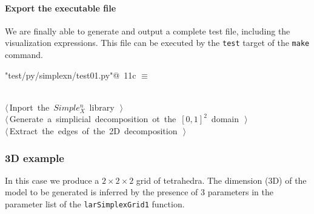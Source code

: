 \documentclass[11pt,oneside]{article}	%
\begin{document}
\paragraph{Export the executable file}
We are finally able to generate and output a complete test file, including the visualization expressions. This file can be executed by the \texttt{test} target of the \texttt{make} command.

\begin{flushleft} \small \label{scrap14}
\protect{}\verb@"test/py/simplexn/test01.py"@\nobreak\ {\footnotesize 11c }$\equiv$
\vspace{-1ex}
\begin{list}{}{} \item
\mbox{}\verb@@\\
\mbox{}\verb@@\hbox{$\langle\,$Inport the $Simple_X^n$ library\nobreak\ {\footnotesize {}}$\,\rangle$}\verb@@\\
\mbox{}\verb@@\hbox{$\langle\,$Generate a simplicial decomposition ot the $[0,1]^2$ domain\nobreak\ {\footnotesize {}}$\,\rangle$}\verb@@\\
\mbox{}\verb@@\hbox{$\langle\,$Extract the edges of the 2D decomposition\nobreak\ {\footnotesize {}}$\,\rangle$}\verb@@\\
\mbox{}\verb@@{\NWsep}
\end{list}
\vspace{-2ex}
\end{flushleft}

\subsubsection{3D example}

In this case we produce a $2\times 2\times 2$ grid of tetrahedra. The dimension (3D) of the model to be generated is inferred by the presence of 3 parameters in the parameter list of the \texttt{larSimplexGrid1} function. 
\end{document}
